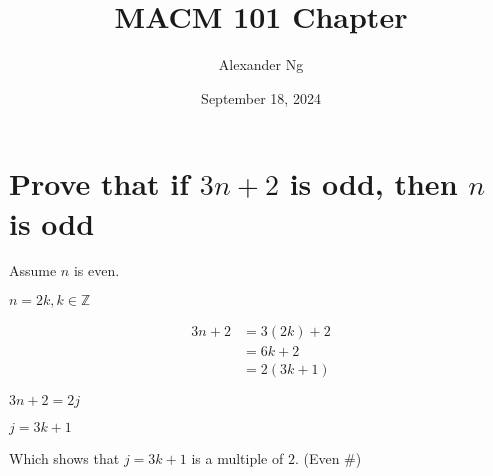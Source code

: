 \documentclass[12pt]{article}
\begin{document}
\title{MACM 101 Chapter}
\author{Alexander Ng}
\date{September 18, 2024}

\maketitle

\section{Prove that if $3n+2$ is odd, then $n$ is odd}

Assume $n$ is even.

$n=2k, k \in \mathbb{Z}$

\begin{align*}
  3n+2 &= 3(2k)+2 \\
       &= 6k + 2 \\
       &= 2(3k + 1)
\end{align*}

$3n+2 = 2j$ 

$j = 3k+1$

Which shows that $j=3k+1$ is a multiple of $2$. (Even #)
\end{document}

